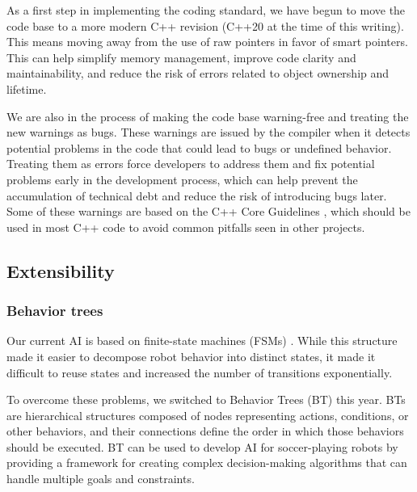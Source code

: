\documentclass[runningheads]{llncs}
\begin{document}
As a first step in implementing the coding standard, we have begun to move the code base to a more modern C++ revision (C++20 at the time of this writing). This means moving away from the use of raw pointers in favor of smart pointers. This can help simplify memory management, improve code clarity and maintainability, and reduce the risk of errors related to object ownership and lifetime.

We are also in the process of making the code base warning-free and treating the new warnings as bugs. These warnings are issued by the compiler when it detects potential problems in the code that could lead to bugs or undefined behavior. Treating them as errors force developers to address them and fix potential problems early in the development process, which can help prevent the accumulation of technical debt and reduce the risk of introducing bugs later. Some of these warnings are based on the C++ Core Guidelines \cite{ref_cppcoreguidelines}, which should be used in most C++ code to avoid common pitfalls seen in other projects.

\subsection{Extensibility}

\subsubsection{Behavior trees}
Our current AI is based on finite-state machines (FSMs) \cite{ref_ETDP2020}. While this structure made it easier to decompose robot behavior into distinct states, it made it difficult to reuse states and increased the number of transitions exponentially. 

To overcome these problems, we switched to Behavior Trees (BT) this year. BTs are hierarchical structures composed of nodes representing actions, conditions, or other behaviors, and their connections define the order in which those behaviors should be executed. BT can be used to develop AI for soccer-playing robots by providing a framework for creating complex decision-making algorithms that can handle multiple goals and constraints.
\end{document}
